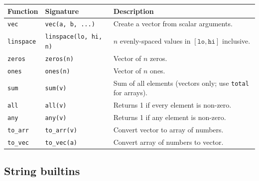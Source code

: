 \documentclass[11pt,a4paper]{article}
\begin{document}
\begin{longtable}{@{}L{3.2cm}L{4.2cm}L{7.3cm}@{}}
\toprule
\textbf{Function} & \textbf{Signature} & \textbf{Description} \\
\midrule
\endhead
\texttt{vec}      & \texttt{vec(a, b, ...)}        & Create a vector from scalar arguments. \\
\texttt{linspace} & \texttt{linspace(lo, hi, n)}   & $n$ evenly-spaced values in $[\texttt{lo}, \texttt{hi}]$ inclusive. \\
\texttt{zeros}    & \texttt{zeros(n)}              & Vector of $n$ zeros. \\
\texttt{ones}     & \texttt{ones(n)}               & Vector of $n$ ones. \\
\texttt{sum}      & \texttt{sum(v)}                & Sum of all elements (vectors only; use \texttt{total} for arrays). \\
\texttt{all}      & \texttt{all(v)}                & Returns 1 if every element is non-zero. \\
\texttt{any}      & \texttt{any(v)}                & Returns 1 if any element is non-zero. \\
\texttt{to\_arr}  & \texttt{to\_arr(v)}            & Convert vector to array of numbers. \\
\texttt{to\_vec}  & \texttt{to\_vec(a)}            & Convert array of numbers to vector. \\
\bottomrule
\end{longtable}

\subsection{String builtins}
\end{document}
